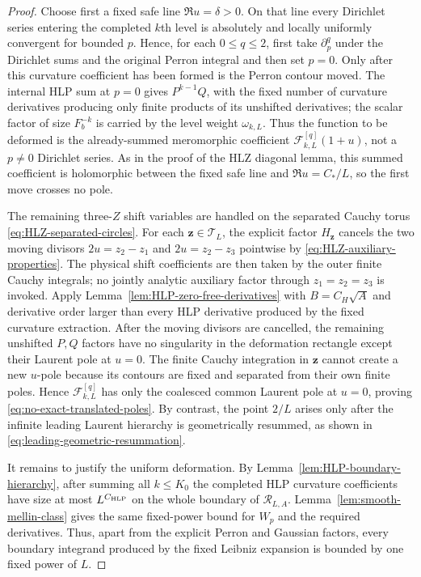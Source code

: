 \begin{proof}
Choose first a fixed safe line $\Re u=\delta>0$. On that line every Dirichlet
series entering the completed $k$th level is absolutely and locally uniformly
convergent for bounded $p$. Hence, for each $0\le q\le2$, first take
$\partial_p^q$ under the Dirichlet sums and the original Perron integral and
then set $p=0$. Only after this curvature coefficient has been formed is the
Perron contour moved. The internal HLP sum at $p=0$ gives $P^{k-1}Q$, with the
fixed number of curvature derivatives producing only finite products of its
unshifted derivatives; the scalar factor of size $F_b^{-k}$ is carried by the
level weight $\omega_{k,L}$. Thus the function to be deformed is the
already-summed meromorphic coefficient $\mathcal F_{k,L}^{[q]}(1+u)$, not a
$p\ne0$ Dirichlet series. As in the proof of the HLZ diagonal lemma, this
summed coefficient is holomorphic between the fixed safe line and
$\Re u=C_*/L$, so the first move crosses no pole.

The remaining three-$Z$ shift variables are handled on the separated Cauchy
torus \eqref{eq:HLZ-separated-circles}.  For each
$\mathbf z\in\mathcal T_L$, the explicit factor
$H_{\mathbf z}$ cancels the two moving divisors
$2u=z_2-z_1$ and $2u=z_2-z_3$ pointwise by
\eqref{eq:HLZ-auxiliary-properties}.  The physical shift coefficients are then
taken by the outer finite Cauchy integrals; no jointly analytic auxiliary
factor through $z_1=z_2=z_3$ is invoked. Apply
Lemma~\ref{lem:HLP-zero-free-derivatives} with $B=C_H\sqrt A$ and derivative
order larger than every HLP derivative produced by the fixed curvature
extraction.  After the moving divisors are cancelled, the remaining unshifted
$P,Q$ factors have no singularity in the deformation rectangle except their
Laurent pole at $u=0$.  The finite Cauchy integration in $\mathbf z$ cannot
create a new $u$-pole because its contours are fixed and separated from their
own finite poles.  Hence $\mathcal F_{k,L}^{[q]}$ has only the coalesced common
Laurent pole at $u=0$, proving \eqref{eq:no-exact-translated-poles}. By
contrast, the point $2/L$ arises only after the infinite leading Laurent
hierarchy is geometrically resummed, as shown in
\eqref{eq:leading-geometric-resummation}.

It remains to justify the uniform deformation.  By
Lemma~\ref{lem:HLP-boundary-hierarchy}, after summing all $k\le K_0$ the
completed HLP curvature coefficients have size at most $L^{C_{\rm HLP}}$ on
the whole boundary of $\mathscr R_{L,A}$.  Lemma~\ref{lem:smooth-mellin-class}
gives the same fixed-power bound for $W_p$ and the required derivatives.
Thus, apart from the explicit Perron and Gaussian factors, every boundary
integrand produced by the fixed Leibniz expansion is bounded by one fixed power
of $L$.


\end{proof}
